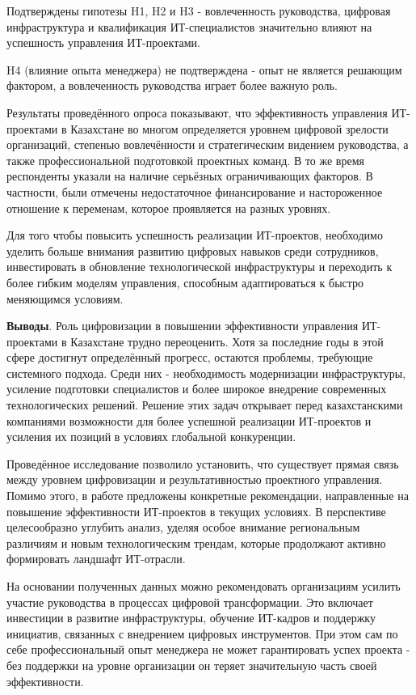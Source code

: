 Подтверждены гипотезы H1, H2 и H3 - вовлеченность руководства, цифровая
инфраструктура и квалификация ИТ-специалистов значительно влияют на
успешность управления ИТ-проектами.

H4 (влияние опыта менеджера) не подтверждена - опыт не является решающим
фактором, а вовлеченность руководства играет более важную роль.

Результаты проведённого опроса показывают, что эффективность управления
ИТ-проектами в Казахстане во многом определяется уровнем цифровой
зрелости организаций, степенью вовлечённости и стратегическим видением
руководства, а также профессиональной подготовкой проектных команд. В то
же время респонденты указали на наличие серьёзных ограничивающих
факторов. В частности, были отмечены недостаточное финансирование и
настороженное отношение к переменам, которое проявляется на разных
уровнях.

Для того чтобы повысить успешность реализации ИТ-проектов, необходимо
уделить больше внимания развитию цифровых навыков среди сотрудников,
инвестировать в обновление технологической инфраструктуры и переходить к
более гибким моделям управления, способным адаптироваться к быстро
меняющимся условиям.

{\bfseries Выводы}. Роль цифровизации в повышении эффективности управления
ИТ-проектами в Казахстане трудно переоценить. Хотя за последние годы в
этой сфере достигнут определённый прогресс, остаются проблемы, требующие
системного подхода. Среди них - необходимость модернизации
инфраструктуры, усиление подготовки специалистов и более широкое
внедрение современных технологических решений. Решение этих задач
открывает перед казахстанскими компаниями возможности для более успешной
реализации ИТ-проектов и усиления их позиций в условиях глобальной
конкуренции.

Проведённое исследование позволило установить, что существует прямая
связь между уровнем цифровизации и результативностью проектного
управления. Помимо этого, в работе предложены конкретные рекомендации,
направленные на повышение эффективности ИТ-проектов в текущих условиях.
В перспективе целесообразно углубить анализ, уделяя особое внимание
региональным различиям и новым технологическим трендам, которые
продолжают активно формировать ландшафт ИТ-отрасли.

На основании полученных данных можно рекомендовать организациям усилить
участие руководства в процессах цифровой трансформации. Это включает
инвестиции в развитие инфраструктуры, обучение ИТ-кадров и поддержку
инициатив, связанных с внедрением цифровых инструментов. При этом сам по
себе профессиональный опыт менеджера не может гарантировать успех
проекта - без поддержки на уровне организации он теряет значительную
часть своей эффективности.

